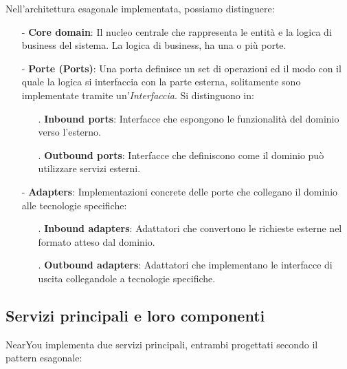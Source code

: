 \documentclass[10pt]{article}
\begin{document}
    Nell'architettura esagonale implementata, possiamo distinguere:
    \begin{itemize}
        \item[-] \textbf{Core domain}: Il nucleo centrale che rappresenta le entità e la logica di business del sistema. La logica di business, ha una o più porte. 
        \item[-] \textbf{Porte (Ports)}: Una porta definisce un set di operazioni ed il modo con il quale la logica si interfaccia con la parte esterna, solitamente sono implementate tramite un'\textit{Interfaccia}. Si distinguono in:
        \begin{itemize}
            \item[.] \textbf{Inbound ports}: Interfacce che espongono le funzionalità del dominio verso l'esterno.
            \item[.] \textbf{Outbound ports}: Interfacce che definiscono come il dominio può utilizzare servizi esterni.
        \end{itemize}
        \item[-] \textbf{Adapters}: Implementazioni concrete delle porte che collegano il dominio alle tecnologie specifiche:
        \begin{itemize}
            \item[.] \textbf{Inbound adapters}: Adattatori che convertono le richieste esterne nel formato atteso dal dominio.
            \item[.] \textbf{Outbound adapters}: Adattatori che implementano le interfacce di uscita collegandole a tecnologie specifiche.
        \end{itemize}
    \end{itemize}

    \subsection{Servizi principali e loro componenti}

    NearYou implementa due servizi principali, entrambi progettati secondo il pattern esagonale:
\end{document}
